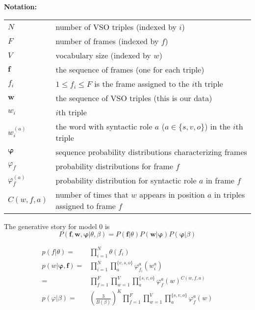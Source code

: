 \documentclass{article}
\begin{document}
\def\blw{\boldsymbol{w}}
\def\blf{\boldsymbol{f}}
\def\blphi{\boldsymbol{\phi}}
\renewcommand\phi\varphi

\textbf{Notation:}
\begin{table}[h]
\begin{tabular}{ll}
$N$                   & number of VSO triples (indexed by $i$)                      \\
$F$                   & number of frames (indexed by $f$)                       \\
$V$                   & vocabulary size (indexed by $w$)\footnotemark\\
$\blf$                   & the sequence of frames (one for each triple)        \\
$f_i$                 & $1\leq f_i\leq F$ is the frame assigned to the $i$th triple      \\
$\blw$           & the sequence of VSO triples (this is our data)                               \\
$ w_i$            & $i$th triple                                            \\
$w_i^{(a)}$           & the word with syntactic role $a$ ($a\in\{s,v,o\}$) in the $i$th triple \\
$\blphi$          & sequence probability distributions characterizing frames    \\
$\phi_f$          & probability distributions for frame $f$                  \\
$\phi_f^{(a)}$        & probability distribution for syntactic role $a$ in frame $f$ \\
$C(w,f,a)$          & number of times that $w$ appears in position $a$ in triples assigned to frame $f$\\
\end{tabular}
\end{table}

The generative story for model 0 is
\[
P(\blf,\blw,\blphi|\theta,\beta)
= P(\blf|\theta)P(\blw|\blphi)P(\blphi|\beta)
\]

\begin{align*}
p(f|\theta)      =& \prod_{i=1}^{N}\theta(f_i)\\
p(w|\blphi,\blf) =& \prod_{i=1}^N\prod_{a}^{\{v,s,o\}}\phi_{f_i}^a(w_i^a)\\
                 =& \prod_{f=1}^{F}\prod_{w=1}^{V}\prod_{a}^{\{s,v,o\}}\phi_f^a(w)^{C(w,f,a)}\\
p(\phi|\beta)    =& (\frac{3}{B(\beta)})^K\prod_{f=1}^{F}\prod_{w=1}^{V}\prod_{a}^{\{s,v,o\}}\phi_f^a(w)
\end{align*}
\end{document}
